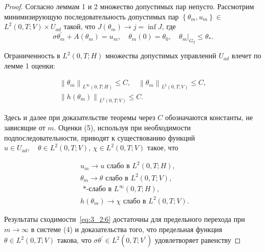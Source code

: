 \begin{proof}
    Согласно леммам 1 и 2 множество допустимых пар непусто.
    Рассмотрим минимизирующую последовательность допустимых
    пар $\left\{\theta_{m}, u_{m}\right\} \in$ $L^{2}(0, T ; V) \times U_{a d}$
    такой, что $J\left(\theta_{m}\right) \rightarrow j=\inf J$, где
    \begin{equation}
        \label{eq:3_2:4}
        \sigma \theta_{m}^{\prime}+A\left(\theta_{m}\right)=u_{m},
        \quad \theta_{m}(0)=\theta_{0},\left.\quad \theta_{m}\right|_{G_{2}} \leq \theta_{*}.
    \end{equation}

    Ограниченность в $L^{2}(0, T ; H)$ множества допустимых
    управлений $U_{a d}$ влечет по лемме 1 оценки:

    \begin{equation}
        \label{eq:3_2:5}
        \begin{gathered}
            \left\|\theta_{m}\right\|_{L^{\infty}(0, T ; H)} \leq C,
            \quad\left\|\theta_{m}\right\|_{L^{2}(0, T ; V)} \leq C, \\
            \left\|h\left(\theta_{m}\right)\right\|_{L^{2}(0, T ; V)} \leq C.
        \end{gathered}
    \end{equation}

    Здесь и далее при доказательстве теоремы через $C$
    обозначаются константы, не зависящие от $m$.
    Оценки (5), используя при необходимости подпоследовательности,
    приводят к существованию функций
    $u \in U_{a d}, \quad \theta \in L^{2}(0, T ; V)$, $\chi  \in L^{2}(0, T; V)$
    такое, что

    \begin{equation}
        \label{eq:3_2:6}
        \begin{aligned}
            & u_{m} \rightarrow u \text { слабо в } L^{2}(0, T ; H), \\
            & \theta_{m} \rightarrow \theta \text { слабо в }
            L^{2}(0, T ; V) \text {, } \\
            & \text { *-слабо в } L^{\infty}(0, T ; H) \text {, } \\
            & h\left(\theta_{m}\right) \rightarrow \chi
            \text { слабо в } L^{2}(0, T ; V) \text {. }
        \end{aligned}
    \end{equation}

    Результаты сходимости~\eqref{eq:3_2:6} достаточны для предельного перехода
    при $m \rightarrow \infty$ в системе (4) и доказательства того,
    что предельная функция $\theta \in L^{2}(0, T ; V) $ такова,
    что $\sigma \theta^{\prime} \in L^{2}\left(0, T ; V^{\prime}\right)$
    удовлетворяет равенству


\end{proof}
